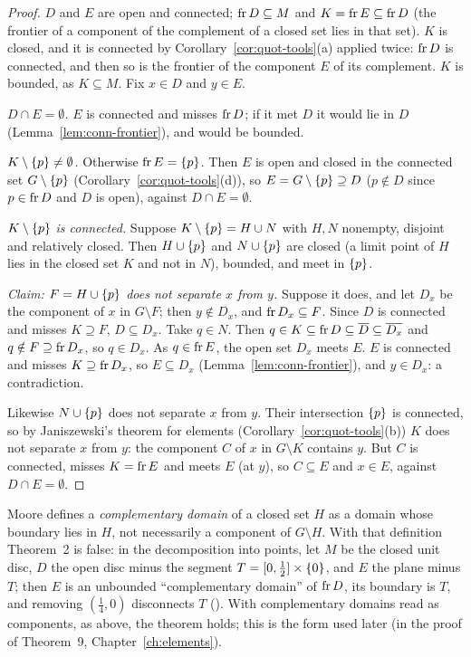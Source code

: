\begin{proof}
$D$ and $E$ are open and connected; $\operatorname{fr} D\subseteq M$ and $K=\operatorname{fr} E\subseteq\operatorname{fr} D$ (the frontier of a
component of the complement of a closed set lies in that set). $K$ is closed, and it is connected by
Corollary~\ref{cor:quot-tools}(a) applied twice: $\operatorname{fr} D$ is connected, and then so is the frontier of
the component $E$ of its complement. $K$ is bounded, as $K\subseteq M$. Fix $x\in D$ and $y\in E$.

\emph{$D\cap E=\emptyset$.} $E$ is connected and misses $\operatorname{fr} D$; if it met $D$ it would lie in $D$
(Lemma~\ref{lem:conn-frontier}), and would be bounded.

\emph{$K\setminus\left\{ p \right\}\neq\emptyset$.} Otherwise $\operatorname{fr} E=\left\{ p \right\}$. Then $E$ is open and closed in the
connected set $G\setminus\left\{ p \right\}$ (Corollary~\ref{cor:quot-tools}(d)), so $E=G\setminus\left\{ p \right\}\supseteq D$
($p\notin D$ since $p\in\operatorname{fr} D$ and $D$ is open), against $D\cap E=\emptyset$.

\emph{$K\setminus\left\{ p \right\}$ is connected.} Suppose $K\setminus\left\{ p \right\}=H\cup N$ with $H,N$ nonempty, disjoint
and relatively closed. Then $H\cup\left\{ p \right\}$ and $N\cup\left\{ p \right\}$ are closed (a limit point of $H$ lies in
the closed set $K$ and not in $N$), bounded, and meet in $\left\{ p \right\}$.

\emph{Claim: $F=H\cup\left\{ p \right\}$ does not separate $x$ from $y$.} Suppose it does, and let $D_x$ be the
component of $x$ in $G\setminus F$; then $y\notin D_x$, and $\operatorname{fr} D_x\subseteq F$. Since $D$ is connected
and misses $K\supseteq F$, $D\subseteq D_x$. Take $q\in N$. Then $q\in K\subseteq\operatorname{fr} D\subseteq\overline{D}\subseteq
\overline{D_x}$ and $q\notin F\supseteq\operatorname{fr} D_x$, so $q\in D_x$. As $q\in\operatorname{fr} E$, the open set $D_x$ meets $E$.
$E$ is connected and misses $K\supseteq\operatorname{fr} D_x$, so $E\subseteq D_x$ (Lemma~\ref{lem:conn-frontier}), and
$y\in D_x$: a contradiction.

Likewise $N\cup\left\{ p \right\}$ does not separate $x$ from $y$. Their intersection $\left\{ p \right\}$ is connected, so by
Janiszewski's theorem for elements (Corollary~\ref{cor:quot-tools}(b)) $K$ does not separate $x$ from
$y$: the component $C$ of $x$ in $G\setminus K$ contains $y$. But $C$ is connected, misses $K=\operatorname{fr} E$
and meets $E$ (at $y$), so $C\subseteq E$ and $x\in E$, against $D\cap E=\emptyset$.
\end{proof}


\begin{remark}\label{rem:m25-2-printed}
Moore defines a \emph{complementary domain} of a closed set $H$ as a domain whose boundary lies
in $H$, not necessarily a component of $G\setminus H$. With that definition Theorem~2 is false: in the
decomposition into points, let $M$ be the closed unit disc, $D$ the open disc minus the segment
$T=[0,\frac12]\times\left\{ 0 \right\}$, and $E$ the plane minus $T$; then $E$ is an unbounded ``complementary
domain'' of $\operatorname{fr} D$, its boundary is $T$, and removing $(\frac14,0)$ disconnects $T$
(). With complementary domains read as components, as above,
the theorem holds; this is the form used later (in the proof of Theorem~9, Chapter~\ref{ch:elements}).
\end{remark}

